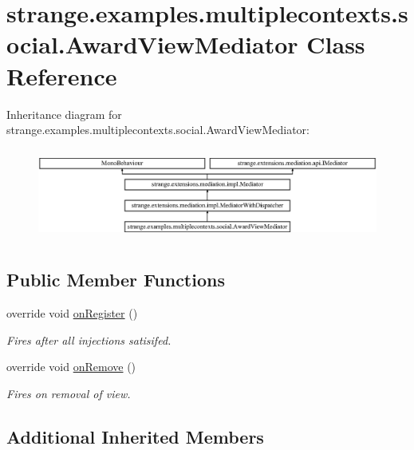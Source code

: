 \hypertarget{classstrange_1_1examples_1_1multiplecontexts_1_1social_1_1_award_view_mediator}{\section{strange.\-examples.\-multiplecontexts.\-social.\-Award\-View\-Mediator Class Reference}
\label{classstrange_1_1examples_1_1multiplecontexts_1_1social_1_1_award_view_mediator}
}
Inheritance diagram for strange.\-examples.\-multiplecontexts.\-social.\-Award\-View\-Mediator\-:\begin{figure}[H]
\begin{center}
\leavevmode
\includegraphics[height=3.060109cm]{classstrange_1_1examples_1_1multiplecontexts_1_1social_1_1_award_view_mediator}
\end{center}
\end{figure}
\subsection*{Public Member Functions}
\begin{DoxyCompactItemize}
\item 
override void \hyperlink{classstrange_1_1examples_1_1multiplecontexts_1_1social_1_1_award_view_mediator_a97e494e5effff9d354766c770dc4081e}{on\-Register} ()
\begin{DoxyCompactList}\small\item\em Fires after all injections satisifed. \end{DoxyCompactList}\item 
override void \hyperlink{classstrange_1_1examples_1_1multiplecontexts_1_1social_1_1_award_view_mediator_ace47ed9d72a78ab654a677b98cd43638}{on\-Remove} ()
\begin{DoxyCompactList}\small\item\em Fires on removal of view. \end{DoxyCompactList}\end{DoxyCompactItemize}
\subsection*{Additional Inherited Members}


